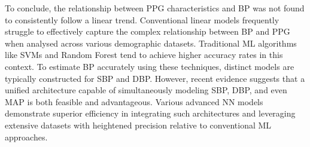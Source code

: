 \vspace{0.2cm}

To conclude, the relationship between PPG characteristics and BP was not found to consistently follow a linear trend.
Conventional linear models frequently struggle to effectively capture the complex relationship between BP and PPG when analysed across various demographic datasets.
Traditional ML algorithms like SVMs and Random Forest tend to achieve higher accuracy rates in this context.
To estimate BP accurately using these techniques, distinct models are typically constructed for SBP and DBP\@.
However, recent evidence suggests that a unified architecture capable of simultaneously modeling SBP, DBP, and even MAP is both feasible and advantageous.
Various advanced NN models demonstrate superior efficiency in integrating such architectures and leveraging extensive datasets with heightened precision relative to conventional ML approaches.